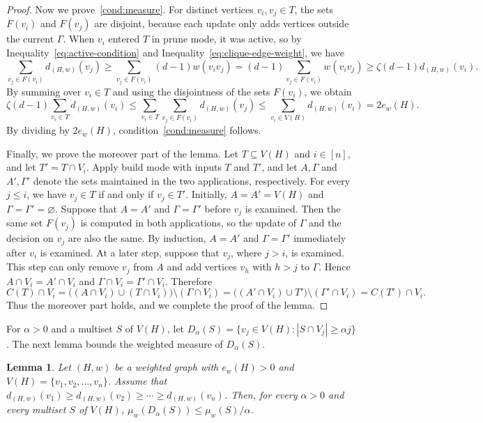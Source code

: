 \documentclass[12pt]{article}
\numberwithin{equation}{section}
\newtheorem{lemma}[theorem]{Lemma}
\theoremstyle{definition}
\begin{document}
\begin{proof}
Now we prove~\ref{cond:measure}. For distinct vertices $v_i,v_{j}\in T$,
the sets $F(v_i)$ and $F(v_{j})$ are disjoint, because each update only adds
vertices outside the current $\Gamma$. When $v_i$ entered $T$ in prune mode,
it was active, so by Inequality~\eqref{eq:active-condition} and
Inequality~\eqref{eq:clique-edge-weight}, we have
\[
 \sum_{v_j \in F(v_i)}d_{(H,w)}(v_j)
 \geq \sum_{v_j \in F(v_i)}(d-1)w(v_iv_j)
 = (d-1)\sum_{v_j \in F(v_i)} w(v_iv_j)
 \geq \zeta(d-1)d_{(H,w)}(v_i).
\]
By summing over $v_i \in T$ and using the disjointness of the sets $F(v_i)$,
we obtain
\[
 \zeta(d-1)\sum_{v_i \in T} d_{(H,w)}(v_i)
 \leq \sum_{v_i \in T} \sum_{v_j \in F(v_i)} d_{(H,w)}(v_j)
 \leq \sum_{v_i \in V(H)} d_{(H,w)}(v_i)
 = 2e_w(H).
\]
By dividing by $2e_w(H)$, condition~\ref{cond:measure} follows.

Finally, we prove the moreover part of the lemma. Let $T \subseteq V(H)$ and
$i \in [n]$, and
let $T' = T \cap V_i$. Apply build mode with inputs $T$ and $T'$, and let
$A,\Gamma$ and $A',\Gamma'$ denote the sets maintained in the two applications,
respectively. For every $j \leq i$, we have $v_j \in T$ if and only if
$v_j \in T'$. Initially, $A=A'=V(H)$ and $\Gamma=\Gamma'=\varnothing$.
Suppose that $A=A'$ and $\Gamma=\Gamma'$ before $v_j$ is examined. Then the
same set $F(v_j)$ is computed in both applications, so the update of $\Gamma$
and the decision on $v_j$ are also the same. By induction, $A=A'$ and
$\Gamma=\Gamma'$ immediately after $v_i$ is examined. At a later
step, suppose that $v_j$, where $j > i$, is examined. This step can only
remove $v_j$ from $A$ and add vertices $v_h$ with $h > j$ to
$\Gamma$. Hence
$A \cap V_i = A' \cap V_i$ and
$\Gamma \cap V_i = \Gamma' \cap V_i$. Therefore
\[
C(T) \cap V_i
 = \big((A \cap V_i) \cup (T \cap V_i)\big) \setminus (\Gamma \cap V_i)
 = \big((A' \cap V_i) \cup T'\big) \setminus (\Gamma' \cap V_i)
 = C(T') \cap V_i.
\]
Thus the moreover part holds, and we complete the proof of the lemma.
\end{proof}

For $\alpha>0$ and a multiset $S$ of $V(H)$, let
$D_\alpha(S)=\{v_j\in V(H):|S\cap V_j|\geq\alpha j\}$.
The next lemma bounds the weighted measure of $D_\alpha(S)$.

\begin{lemma}\label{lem:prefix}
Let $(H,w)$ be a weighted graph with $e_w(H) > 0$ and
$V(H) = \{v_1,v_2,\ldots,v_n\}$. Assume that
$d_{(H,w)}(v_1) \geq d_{(H,w)}(v_2) \geq \cdots
\geq d_{(H,w)}(v_n)$. Then, for every $\alpha>0$ and every multiset $S$ of
$V(H)$,
$\mu_w(D_\alpha(S)) \leq \mu_w(S)/\alpha$.
\end{lemma}
\end{document}
